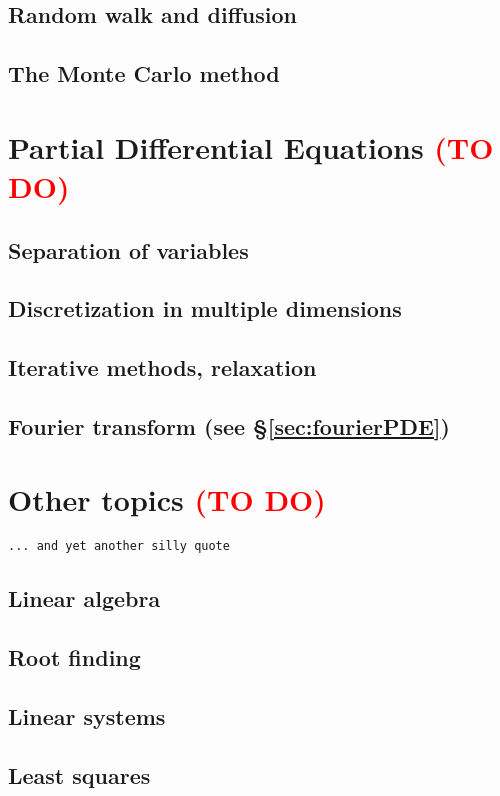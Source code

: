 \documentclass[a4paper,openright,12pt]{memoir}
\numberwithin{ctExample}{chapter}
\numberwithin{ctProblem}{chapter}
\begin{document}
\section{Random walk and diffusion}
\section{The Monte Carlo method}


\chapter{Partial Differential Equations \textcolor{red}{(TO DO)}}
\label{chap:PDE}

\section{Separation of variables}
\section{Discretization in multiple dimensions}
\section{Iterative methods, relaxation}
\section{Fourier transform (see \S\ref{sec:fourierPDE})}




\chapter{Other topics \textcolor{red}{(TO DO)}}
\vspace*{-1cm}
\begin{flushright}
\texttt{... and yet another silly quote}
\end{flushright}
\section{Linear algebra}
\section{Root finding}
\section{Linear systems}
\section{Least squares}


% 


\end{document}
